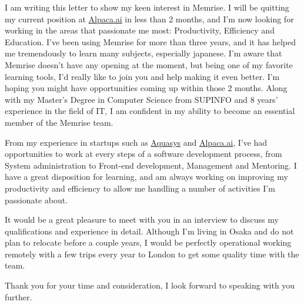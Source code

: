 \documentclass[10pt,stdletter,dateno,sigleft]{newlfm} %
\begin{document}
\begin{newlfm}


I am writing this letter to show my keen interest in Memrise. I will be
quitting my current position at \href{https://www.alpaca.ai/}{Alpaca.ai}
in less than 2 months, and I'm now looking for working in the areas that
passionate me most: Productivity, Efficiency and Education. I've been using
Memrise for more than three years, and it has helped me tremendously to learn
many subjects, especially japanese. I'm aware that Memrise doesn't have any
opening at the moment, but being one of my favorite learning tools, I'd really
like to join you and help making it even better. I'm hoping you might have opportunities
coming up within those 2 months. Along with my Master's Degree in Computer
Science from SUPINFO and 8 years' experience in the field of IT, I am confident
in my ability to become an essential member of the Memrise team.

From my experience in startups such as
\href{http://www.aquasys.co.jp/}{Aquasys} and
\href{https://www.alpaca.ai/}{Alpaca.ai}, I've had opportunities to work at
every steps of a software development process, from System administration to
Front-end development, Management and Mentoring. I have a great disposition for
learning, and am always working on improving my productivity and efficiency to
allow me handling a number of activities I'm passionate about. 

It would be a great pleasure to meet with you in an interview to discuss my
qualifications and experience in detail. Although I'm living in Osaka and do not
plan to relocate before a couple years, I would be perfectly operational working
remotely with a few trips every year to London to get some quality time with
the team.

Thank you for your time and consideration, I look forward to speaking with you
further.


\end{newlfm}
\end{document}
